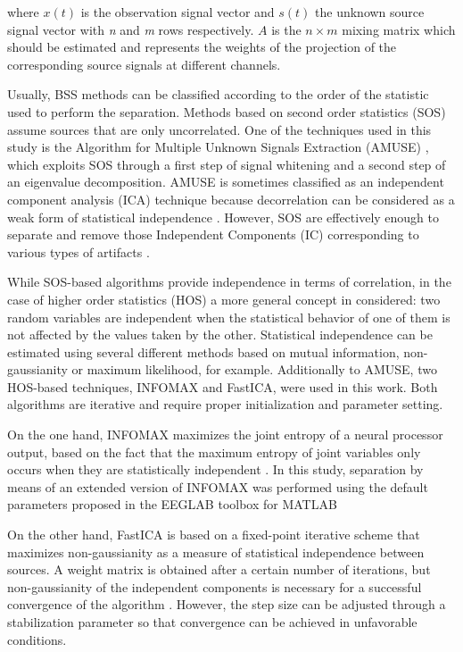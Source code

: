 where $x(t)$ is the observation signal vector and $s(t)$ the unknown source signal vector with \textit{n} and \textit{m} rows respectively. $A$ is the $n \times m$ mixing matrix which should be estimated and represents the weights of the projection of the corresponding source signals at different channels.

Usually, BSS methods can be classified according to the order of the statistic used to perform the separation. Methods based on second order statistics (SOS) assume sources that are only uncorrelated. One of the techniques used in this study is the Algorithm for Multiple Unknown Signals Extraction (AMUSE) \citep{Tong1991}, which exploits SOS through a first step of signal whitening and a second step of an eigenvalue decomposition. AMUSE is sometimes classified as an independent component analysis (ICA) technique because decorrelation can be considered as a weak form of statistical independence \citep{Hyvarinen2001}. However, SOS are effectively enough to separate and remove those Independent Components (IC) corresponding to various types of artifacts \citep{Escudero2010}.

While SOS-based algorithms provide independence in terms of correlation, in the case of higher order statistics (HOS) a more general concept in considered: two random variables are independent when the statistical behavior of one of them is not affected by the values taken by the other. Statistical independence can be estimated using several different methods based on mutual information, non-gaussianity or maximum likelihood, for example. Additionally to AMUSE, two HOS-based techniques, INFOMAX and FastICA, were used in this work. Both algorithms are iterative and require proper initialization and parameter setting.

On the one hand, INFOMAX maximizes the joint entropy of a neural processor output, based on the fact that the maximum entropy of joint variables only occurs when they are statistically independent \citep{Bell1995}. In this study, separation by means of an extended version of INFOMAX was performed using the default parameters proposed in the EEGLAB toolbox for MATLAB \citep{Delorme2004,Lee1999}

On the other hand, FastICA is based on a fixed-point iterative scheme that maximizes non-gaussianity as a measure of statistical independence between sources. A weight matrix is obtained after a certain number of iterations, but non-gaussianity of the independent components is necessary for a successful convergence of the algorithm \citep{Hyvarinen1999}. However, the step size can be adjusted through a stabilization parameter so that convergence can be achieved in unfavorable conditions.

